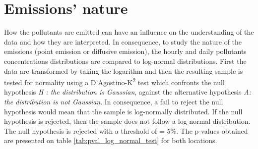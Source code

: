 \documentclass[a4paper, 12pt]{article}
\begin{document}
\section{Emissions' nature} \label{emission_type}

    How the pollutants are emitted can have an influence on the understanding of the data and how they are interpreted. In consequence, to study the nature of the emissions (point emission or diffusive emission), the hourly and daily pollutants concentrations distributions are compared to log-normal distributions. First the data are transformed by taking the logarithm and then the resulting sample is tested for normality using a D'Agostino-K\textsuperscript{2} test which confronts the null hypothesis \textit{H : the distribution is Gaussian}, against the alternative hypothesis \textit{A: the distribution is not Gaussian}. In consequence, a fail to reject the null hypothesis would mean that the sample is log-normally distributed. If the null hypothesis is rejected, then the sample does not follow a log-normal distribution. The null hypothesis is rejected with a threshold of \textalpha = 5\%. The p-values obtained are presented on table \ref{tab:pval_log_normal_test} for both locations. 
    \\
\end{document}

